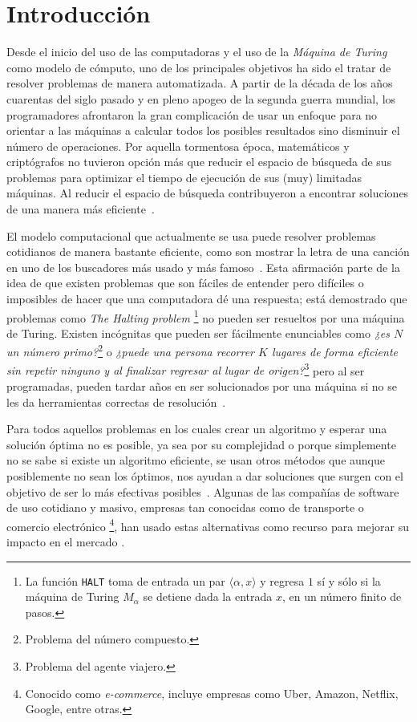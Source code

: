 \chapter{Introducción}

Desde el inicio del uso de las computadoras y el uso de la \textit{Máquina de
  Turing} como modelo de cómputo, uno de los principales objetivos ha sido el
tratar de resolver problemas de manera automatizada. A partir de la década de
los años cuarentas del siglo pasado y en pleno apogeo de la segunda guerra
mundial, los programadores afrontaron la gran complicación de usar un enfoque
para no orientar a las máquinas a calcular todos los posibles resultados sino
disminuir el número de operaciones. Por aquella tormentosa época, matemáticos y
criptógrafos no tuvieron opción más que reducir el espacio de búsqueda de sus
problemas para optimizar el tiempo de ejecución de sus (muy) limitadas
máquinas. Al reducir el espacio de búsqueda contribuyeron a encontrar soluciones
de una manera más eficiente~\cite{GalavizCasas}.

El modelo computacional que actualmente se usa puede resolver problemas
cotidianos de manera bastante eficiente, como son mostrar la letra de una canción en
uno de los buscadores más usado y más famoso~\cite{Harikumar}. Esta afirmación
parte de la idea de que existen problemas que son fáciles de entender pero
difíciles o imposibles de hacer que una computadora dé una respuesta;
está demostrado que problemas como \textit{The Halting problem}
\footnote{La función \texttt{HALT} toma de entrada un par $\langle \alpha, x
\rangle$ y regresa $1$ sí y sólo si la máquina de Turing $M_{\alpha}$ se
detiene dada la entrada $x$, en un número finito de pasos.} no pueden
ser resueltos por una máquina de Turing.
Existen incógnitas que pueden ser fácilmente enunciables como \textit{¿es $N$ un número
primo?}\footnote{Problema del número compuesto.} o \textit{¿puede una persona
recorrer $K$ lugares de forma eficiente sin repetir ninguno y al finalizar
regresar al lugar de origen?}\footnote{Problema del agente viajero.} pero al ser programadas,
pueden tardar años en ser solucionados por una máquina si no se les da
herramientas correctas de resolución~\cite{arora2009computational}.

Para todos aquellos problemas en los cuales crear un algoritmo y esperar
una solución óptima no es posible, ya sea por su complejidad o porque
simplemente no se sabe si existe un algoritmo eficiente, se usan otros métodos
que aunque posiblemente no sean los óptimos, nos ayudan a dar soluciones que
surgen con el objetivo de ser lo más efectivas posibles~\cite{Pearl1984}.
Algunas de las compañías de software de uso cotidiano y masivo, empresas tan
conocidas como de transporte\cite{uber-heuristic} o comercio electrónico
\footnote{Conocido como \textit{e-commerce}, incluye empresas como Uber,
Amazon, Netflix, Google, entre otras.}, han usado estas
alternativas como recurso para mejorar su impacto en el mercado\cite{Linden} \cite{Smith2017}.

